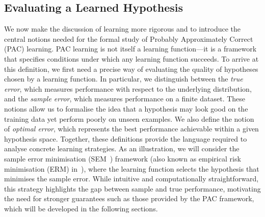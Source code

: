 \subsection{Evaluating a Learned Hypothesis}\label{subsec:evaluating-hypothesis}

We now make the discussion of learning more rigorous and to introduce the central notions needed for the formal study of Probably Approximately Correct (PAC) learning. PAC learning is not itself a learning function—it is a framework that specifies conditions under which any learning function succeeds. To arrive at this definition, we first need a precise way of evaluating the quality of hypotheses chosen by a learning function. In particular, we distinguish between the \emph{true error}, which measures performance with respect to the underlying distribution, and the \emph{sample error}, which measures performance on a finite dataset. These notions allow us to formalise the idea that a hypothesis may look good on the training data yet perform poorly on unseen examples. We also define the notion of \emph{optimal error}, which represents the best performance achievable within a given hypothesis space. Together, these definitions provide the language required to analyse concrete learning strategies. As an illustration, we will consider the sample error minimisation (SEM~\cite{KrappWirth2021}) framework (also known as empirical risk minimisation (ERM) in~\cite{UnderstandinMachineLearning}), where the learning function selects the hypothesis that minimises the sample error. While intuitive and computationally straightforward, this strategy highlights the gap between sample and true performance, motivating the need for stronger guarantees such as those provided by the PAC framework, which will be developed in the following sections.


